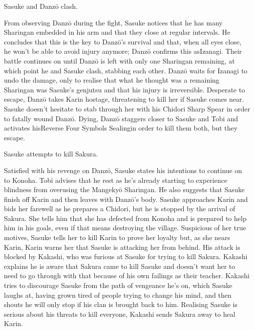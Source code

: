 \documentclass[a4paper,12pt]{article}
\begin{document}
Sasuke and Danzō clash.\\ \par \vspace{0.5cm}

From observing Danzō during the fight, Sasuke notices that he has many Sharingan embedded in his arm and that they close at regular intervals. He concludes that this is the key to Danzō's survival and that, when all eyes close, he won't be able to avoid injury anymore; Danzō confirms this asIzanagi. Their battle continues on until Danzō is left with only one Sharingan remaining, at which point he and Sasuke clash, stabbing each other. Danzō waits for Izanagi to undo the damage, only to realise that what he thought was a remaining Sharingan was Sasuke's genjutsu and that his injury is irreversible. Desperate to escape, Danzō takes Karin hostage, threatening to kill her if Sasuke comes near. Sasuke doesn't hesitate to stab through her with his Chidori Sharp Spear in order to fatally wound Danzō. Dying, Danzō staggers closer to Sasuke and Tobi and activates hisReverse Four Symbols Sealingin order to kill them both, but they escape.\\ \par \vspace{0.5cm}

Sasuke attempts to kill Sakura.\\ \par \vspace{0.5cm}

Satisfied with his revenge on Danzō, Sasuke states his intentions to continue on to Konoha. Tobi advises that he rest as he's already starting to experience blindness from overusing the Mangekyō Sharingan. He also suggests that Sasuke finish off Karin and then leaves with Danzō's body. Sasuke approaches Karin and bids her farewell as he prepares a Chidori, but he is stopped by the arrival of Sakura. She tells him that she has defected from Konoha and is prepared to help him in his goals, even if that means destroying the village. Suspicious of her true motives, Sasuke tells her to kill Karin to prove her loyalty but, as she nears Karin, Karin warns her that Sasuke is attacking her from behind. His attack is blocked by Kakashi, who was furious at Sasuke for trying to kill Sakura. Kakashi explains he is aware that Sakura came to kill Sasuke and doesn't want her to need to go through with that because of his own failings as their teacher. Kakashi tries to discourage Sasuke from the path of vengeance he's on, which Sasuke laughs at, having grown tired of people trying to change his mind, and then shouts he will only stop if his clan is brought back to him. Realising Sasuke is serious about his threats to kill everyone, Kakashi sends Sakura away to heal Karin.\\ \par \vspace{0.5cm}
\end{document}
